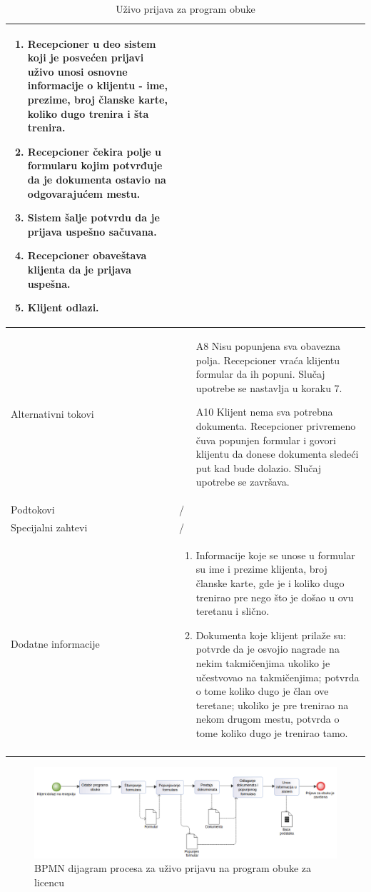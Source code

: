 \documentclass[../../main.tex]{subfiles}
\begin{document}
\begin{longtable}{| p{} | p{} |}
\begin{enumerate}
        \item Recepcioner u deo sistem koji je posvećen prijavi uživo unosi osnovne informacije o klijentu - ime, prezime, broj članske karte, koliko dugo trenira i šta trenira.
        \item Recepcioner čekira polje u formularu kojim potvrđuje da je dokumenta ostavio na odgovarajućem mestu.
        \item Sistem šalje potvrdu da je prijava uspešno sačuvana.
        \item Recepcioner obaveštava klijenta da je prijava uspešna.
        \item Klijent odlazi.
    \end{enumerate}\\
\hline
    Alternativni tokovi & 
    \begin{itemize}
        \item[A8] Nisu popunjena sva obavezna polja. Recepcioner vraća klijentu formular da ih popuni. Slučaj upotrebe se nastavlja u koraku 7.
        \item[A10] Klijent nema sva potrebna dokumenta. Recepcioner privremeno čuva popunjen formular i govori klijentu da donese dokumenta sledeći put kad bude dolazio. Slučaj upotrebe se završava. 
    \end{itemize} \\
\hline
    Podtokovi & /\\
\hline
    Specijalni zahtevi & /\\
\hline
    Dodatne informacije &
    \begin{enumerate}
        \item Informacije koje se unose u formular su ime i prezime klijenta, broj članske karte, gde je i koliko dugo trenirao pre nego što je došao u ovu teretanu i slično.
        \item Dokumenta koje klijent prilaže su: potvrde da je osvojio nagrade na nekim takmičenjima ukoliko je učestvovao na takmičenjima; potvrda o tome koliko dugo je član ove teretane; ukoliko je pre trenirao na nekom drugom mestu, potvrda o tome koliko dugo je trenirao tamo.
    \end{enumerate}\\
\hline
\caption{Uživo prijava za program obuke}
\end{longtable}

\begin{figure}[!ht]
\begin{center}
\includegraphics[scale=0.40]{sections/images/bpmn_dijagram_procesa_prijava_za_licencu.png}
\end{center}
\caption{BPMN dijagram procesa za uživo prijavu na program obuke za licencu}
\label{fig:kontekst}
\end{figure}
\end{document}
